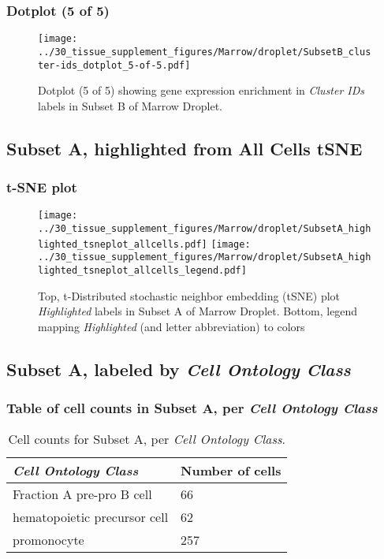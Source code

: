 \clearpage

\subsubsection{Dotplot (5 of 5)}
\begin{figure}[h]
\centering
\texttt{[image: ../30\_tissue\_supplement\_figures/Marrow/droplet/SubsetB\_cluster-ids\_dotplot\_5-of-5.pdf]}

\caption{ Dotplot (5 of 5)  showing gene expression enrichment in \emph{Cluster IDs} labels in Subset B of Marrow Droplet. }
\end{figure}


\clearpage
\subsection{Subset A, highlighted from All Cells tSNE}
\subsubsection{t-SNE plot}
\begin{figure}[h]
\centering
\texttt{[image: ../30\_tissue\_supplement\_figures/Marrow/droplet/SubsetA\_highlighted\_tsneplot\_allcells.pdf]}
\texttt{[image: ../30\_tissue\_supplement\_figures/Marrow/droplet/SubsetA\_highlighted\_tsneplot\_allcells\_legend.pdf]}
\caption{Top, t-Distributed stochastic neighbor embedding (tSNE) plot  \emph{Highlighted} labels in Subset A of Marrow Droplet. Bottom, legend mapping \emph{Highlighted} (and letter abbreviation) to colors}
\end{figure}


\clearpage

\subsection{Subset A, labeled by \emph{Cell Ontology Class}}
\subsubsection{Table of cell counts in Subset A, per \emph{Cell Ontology Class}}\begin{table}[h]
\centering
\label{my-label}
\begin{tabular}{@{}ll@{}}
\toprule

\emph{Cell Ontology Class}& Number of cells \\ \midrule
Fraction A pre-pro B cell & 66 \\

hematopoietic precursor cell & 62 \\

promonocyte & 257 \\
\bottomrule
\end{tabular}
\caption{Cell counts for Subset A, per \emph{Cell Ontology Class}.}
\end{table}

